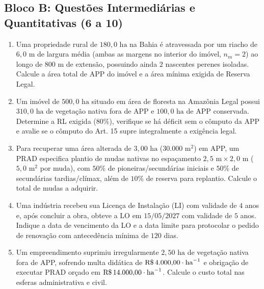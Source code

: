 \subsection*{Bloco B: Questões Intermediárias e Quantitativas (6 a 10)}
\begin{enumerate}[leftmargin=1.8em, itemsep=6pt, start=6]
  \item Uma propriedade rural de $180{,}0\text{ ha}$ na Bahia é atravessada por um riacho de $6{,}0\text{ m}$ de largura média (ambas as margens no interior do imóvel, $n_m = 2$) ao longo de $800\text{ m}$ de extensão, possuindo ainda $2$ nascentes perenes isoladas. Calcule a área total de APP do imóvel e a área mínima exigida de Reserva Legal.
  \espacoResolucao[2.1cm]

  \item Um imóvel de $500{,}0\text{ ha}$ situado em área de floresta na Amazônia Legal possui $310{,}0\text{ ha}$ de vegetação nativa fora de APP e $100{,}0\text{ ha}$ de APP conservada. Determine a RL exigida ($80\%$), verifique se há déficit sem o cômputo da APP e avalie se o cômputo do Art. 15 supre integralmente a exigência legal.
  \espacoResolucao[2.1cm]

  \item Para recuperar uma área alterada de $3{,}00\text{ ha}$ ($30.000\text{ m}^2$) em APP, um PRAD especifica plantio de mudas nativas no espaçamento $2{,}5\text{ m} \times 2{,}0\text{ m}$ ($5{,}0\text{ m}^2$ por muda), com $50\%$ de pioneiras/secundárias iniciais e $50\%$ de secundárias tardias/clímax, além de $10\%$ de reserva para replantio. Calcule o total de mudas a adquirir.
  \espacoResolucao[2.1cm]

  \item Uma indústria recebeu sua Licença de Instalação (LI) com validade de $4$ anos e, após concluir a obra, obteve a LO em $15/05/2027$ com validade de $5$ anos. Indique a data de vencimento da LO e a data limite para protocolar o pedido de renovação com antecedência mínima de $120$ dias.
  \espacoResolucao[2.1cm]

  \item Um empreendimento suprimiu irregularmente $2{,}50\text{ ha}$ de vegetação nativa fora de APP, sofrendo multa didática de $\text{R\$\,}{4.000{,}00}\cdot\text{ha}^{-1}$ e obrigação de executar PRAD orçado em $\text{R\$\,}{14.000{,}00}\cdot\text{ha}^{-1}$. Calcule o custo total nas esferas administrativa e civil.
  \espacoResolucao[2.1cm]
\end{enumerate}


